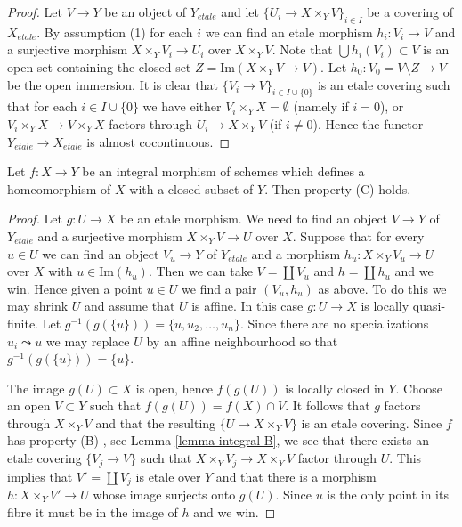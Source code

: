 \begin{proof}
Let $V \to Y$ be an object of $Y_{etale}$ and let
$\{U_i \to X \times_Y V\}_{i \in I}$ be a covering of $X_{etale}$.
By assumption (1) for each $i$ we can find an etale morphism
$h_i : V_i \to V$ and a surjective morphism $X \times_Y V_i \to U_i$
over $X \times_Y V$. Note that $\bigcup h_i(V_i) \subset V$ is an
open set containing the closed set $Z = \text{Im}(X \times_Y V \to V)$.
Let $h_0 : V_0 = V \setminus Z \to V$ be the open immersion.
It is clear that $\{V_i \to V\}_{i \in I \cup \{0\}}$ is an
etale covering such that for each $i \in I \cup \{0\}$ we have
either $V_i \times_Y X = \emptyset$ (namely if $i = 0$), or
$V_i \times_Y X \to V \times_Y X$ factors through $U_i \to X \times_Y V$
(if $i \not = 0$). Hence the functor $Y_{etale} \to X_{etale}$
is almost cocontinuous.
\end{proof}

\begin{lemma}
\label{lemma-integral-homeo-onto-image-C}
Let $f : X \to Y$ be an integral morphism of schemes which defines
a homeomorphism of $X$ with a closed subset of $Y$.
Then property (C) holds.
\end{lemma}

\begin{proof}
Let $g : U \to X$ be an etale morphism. We need to find an object
$V \to Y$ of $Y_{etale}$ and a surjective morphism $X \times_Y V \to U$ over
$X$. Suppose that for every $u \in U$ we can find an object
$V_u \to Y$ of $Y_{etale}$ and a morphism $h_u : X \times_Y V_u \to U$ over
$X$ with $u \in \text{Im}(h_u)$. Then we can take $V = \coprod V_u$
and $h = \coprod h_u$ and we win. Hence given a point
$u \in U$ we find a pair $(V_u, h_u)$ as above. To do this we may
shrink $U$ and assume that $U$ is affine. In this case
$g : U \to X$ is locally quasi-finite. Let
$g^{-1}(g(\{u\})) = \{u, u_2, \ldots, u_n\}$. Since there are no
specializations $u_i \leadsto u$ we may replace $U$ by an affine neighbourhood
so that $g^{-1}(g(\{u\})) = \{u\}$.

\medskip\noindent
The image $g(U) \subset X$ is open,
hence $f(g(U))$ is locally closed in $Y$. Choose an open $V \subset Y$ such
that $f(g(U)) = f(X) \cap V$. It follows that $g$ factors through
$X \times_Y V$ and that the resulting $\{U \to X \times_Y V\}$ is an etale
covering. Since $f$ has property (B) , see
Lemma \ref{lemma-integral-B},
we see that there exists an etale covering $\{V_j \to V\}$ such that
$X \times_Y V_j \to X \times_Y V$ factor through $U$.
This implies that $V' = \coprod V_j$ is etale over $Y$ and that there is a
morphism $h : X \times_Y V' \to U$ whose image
surjects onto $g(U)$. Since $u$ is the only point in its fibre it must
be in the image of $h$ and we win.
\end{proof}

